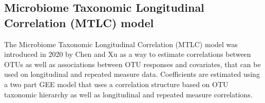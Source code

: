 \documentclass[12pt]{article}
\begin{document}
\begin{singlespace}
  \section{Microbiome Taxonomic Longitudinal Correlation (MTLC) model}
\end{singlespace}

The Microbiome Taxonomic Longitudinal Correlation (MTLC) model was introduced in 2020 by Chen and Xu\cite{chen2020generalized} as a way to estimate correlations between OTUs as well as associations between OTU responses and covariates, that can be used on longitudinal and repeated measure data. Coefficients are estimated using a two part GEE model that uses a correlation structure based on OTU taxonomic hierarchy as well as longitudinal and repeated measure correlations.


%

\end{document}
